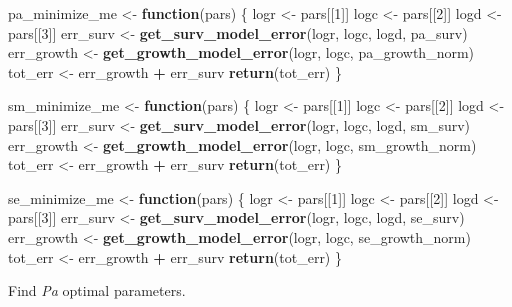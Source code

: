 \documentclass[]{article}
\newenvironment{Shaded}{\begin{snugshade}}{\end{snugshade}}
\newcommand{\KeywordTok}[1]{\textcolor[rgb]{0.13,0.29,0.53}{\textbf{#1}}}
\newcommand{\DecValTok}[1]{\textcolor[rgb]{0.00,0.00,0.81}{#1}}
\newcommand{\StringTok}[1]{\textcolor[rgb]{0.31,0.60,0.02}{#1}}
\newcommand{\ControlFlowTok}[1]{\textcolor[rgb]{0.13,0.29,0.53}{\textbf{#1}}}
\newcommand{\OperatorTok}[1]{\textcolor[rgb]{0.81,0.36,0.00}{\textbf{#1}}}
\newcommand{\NormalTok}[1]{#1}
\begin{document}
\begin{Shaded}
\begin{Highlighting}[]
\NormalTok{pa_minimize_me <-}\StringTok{ }\ControlFlowTok{function}\NormalTok{(pars) \{}
\NormalTok{  logr <-}\StringTok{ }\NormalTok{pars[[}\DecValTok{1}\NormalTok{]] }
\NormalTok{  logc <-}\StringTok{ }\NormalTok{pars[[}\DecValTok{2}\NormalTok{]]}
\NormalTok{  logd <-}\StringTok{ }\NormalTok{pars[[}\DecValTok{3}\NormalTok{]]}
\NormalTok{  err_surv <-}\StringTok{ }\KeywordTok{get_surv_model_error}\NormalTok{(logr, logc, logd, pa_surv)}
\NormalTok{  err_growth <-}\StringTok{ }\KeywordTok{get_growth_model_error}\NormalTok{(logr, logc, pa_growth_norm)}
\NormalTok{  tot_err <-}\StringTok{ }\NormalTok{err_growth }\OperatorTok{+}\StringTok{ }\NormalTok{err_surv}
  \KeywordTok{return}\NormalTok{(tot_err)}
\NormalTok{\}}

\NormalTok{sm_minimize_me <-}\StringTok{ }\ControlFlowTok{function}\NormalTok{(pars) \{}
\NormalTok{  logr <-}\StringTok{ }\NormalTok{pars[[}\DecValTok{1}\NormalTok{]] }
\NormalTok{  logc <-}\StringTok{ }\NormalTok{pars[[}\DecValTok{2}\NormalTok{]]}
\NormalTok{  logd <-}\StringTok{ }\NormalTok{pars[[}\DecValTok{3}\NormalTok{]]}
\NormalTok{  err_surv <-}\StringTok{ }\KeywordTok{get_surv_model_error}\NormalTok{(logr, logc, logd, sm_surv)}
\NormalTok{  err_growth <-}\StringTok{ }\KeywordTok{get_growth_model_error}\NormalTok{(logr, logc, sm_growth_norm)}
\NormalTok{  tot_err <-}\StringTok{ }\NormalTok{err_growth }\OperatorTok{+}\StringTok{ }\NormalTok{err_surv}
  \KeywordTok{return}\NormalTok{(tot_err)}
\NormalTok{\}}

\NormalTok{se_minimize_me <-}\StringTok{ }\ControlFlowTok{function}\NormalTok{(pars) \{}
\NormalTok{  logr <-}\StringTok{ }\NormalTok{pars[[}\DecValTok{1}\NormalTok{]] }
\NormalTok{  logc <-}\StringTok{ }\NormalTok{pars[[}\DecValTok{2}\NormalTok{]]}
\NormalTok{  logd <-}\StringTok{ }\NormalTok{pars[[}\DecValTok{3}\NormalTok{]]}
\NormalTok{  err_surv <-}\StringTok{ }\KeywordTok{get_surv_model_error}\NormalTok{(logr, logc, logd, se_surv)}
\NormalTok{  err_growth <-}\StringTok{ }\KeywordTok{get_growth_model_error}\NormalTok{(logr, logc, se_growth_norm)}
\NormalTok{  tot_err <-}\StringTok{ }\NormalTok{err_growth }\OperatorTok{+}\StringTok{ }\NormalTok{err_surv}
  \KeywordTok{return}\NormalTok{(tot_err)}
\NormalTok{\}}
\end{Highlighting}
\end{Shaded}

Find \emph{Pa} optimal parameters.
\end{document}

